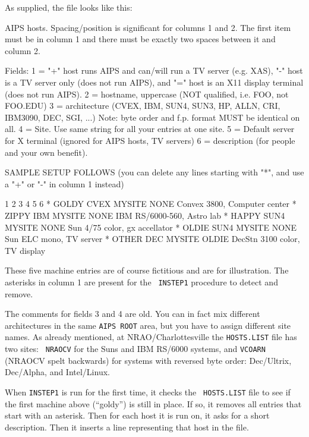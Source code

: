 As supplied, the file looks like this:\medskip

\fortran
AIPS hosts.  Spacing/position is significant for columns 1 and 2.  The
first item must be in column 1 and there must be exactly two spaces
between it and column 2.

Fields: 1 = "+"  host runs AIPS and can/will run a TV server (e.g. XAS),
            "-"  host is a TV server only (does not run AIPS), and
            "="  host is an X11 display terminal (does not run AIPS).
        2 = hostname, uppercase (NOT qualified, i.e. FOO, not FOO.EDU)
        3 = architecture (CVEX, IBM, SUN4, SUN3, HP, ALLN, CRI, IBM3090,
                          DEC, SGI, ...)
              Note: byte order and f.p. format MUST be identical on all.
        4 = Site.  Use same string for all your entries at one site.
        5 = Default server for X terminal (ignored for AIPS hosts, TV
              servers)
        6 = description (for people and your own benefit).

SAMPLE SETUP FOLLOWS (you can delete any lines starting with "*", and
        use a "+" or "-" in column 1 instead)

1  2          3       4        5           6
*  GOLDY      CVEX    MYSITE   NONE        Convex 3800, Computer center
*  ZIPPY      IBM     MYSITE   NONE        IBM RS/6000-560, Astro lab
*  HAPPY      SUN4    MYSITE   NONE        Sun 4/75 color, gx accellator
*  OLDIE      SUN4    MYSITE   NONE        Sun ELC mono, TV server
*  OTHER      DEC     MYSITE   OLDIE       DecStn 3100 color, TV display
\endfortran
\medskip

\noindent These five machine entries are of course fictitious and are
for illustration.  The asterisks in column 1 are present for the {\tt
INSTEP1} procedure to detect and remove.

The comments for fields 3 and 4 are old.  You can in fact mix different
architectures in the same {\tt\dol AIPS ROOT} area, but you have to
assign different site names.  As already mentioned, at
NRAO/Char\-lottes\-ville the {\tt HOSTS.LIST} file has two sites: {\tt
NRAOCV} for the Suns and IBM RS/6000 systems, and {\tt VCOARN} (NRAOCV
spelt backwards) for systems with reversed byte order: Dec/Ultrix,
Dec/Alpha, and Intel/Linux.

When {\tt INSTEP1} is run for the first time, it checks the {\tt
HOSTS.LIST} file to see if the first machine above (``goldy'') is still
in place.  If so, it removes all entries that start with an asterisk.
Then for each host it is run on, it asks for a short description.  Then
it inserts a line representing that host in the file.

